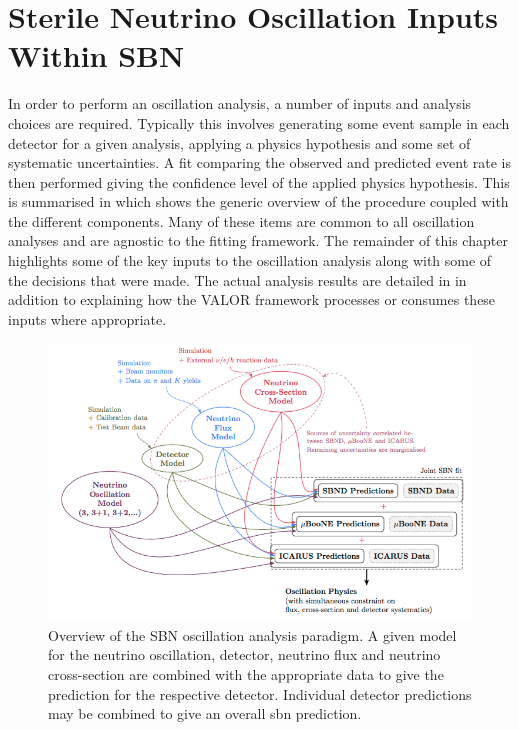 \chapter{Sterile Neutrino Oscillation Inputs Within SBN}
\label{chap:osc_inputs}

In order to perform an oscillation analysis, a number of inputs and analysis choices are required. Typically this involves generating some event sample in each detector for a given analysis, applying a physics hypothesis and some set of systematic uncertainties. A fit comparing the observed and predicted event rate is then performed giving the confidence level of the applied physics hypothesis. This is summarised in  which shows the generic overview of the procedure coupled with the different components. Many of these items are common to all oscillation analyses and are agnostic to the fitting framework. The remainder of this chapter highlights some of the key inputs to the oscillation analysis along with some of the decisions that were made. The actual analysis results are detailed in  in addition to explaining how the VALOR framework processes or consumes these inputs where appropriate.

\begin{figure}[!h]
    \centering
    \includegraphics[width = \textwidth]{figures-chap5/valor_analysis.png}
    \caption[SBN Oscillation analysis paradigm.]{Overview of the SBN oscillation analysis paradigm. A given model for the neutrino oscillation, detector, neutrino flux and neutrino cross-section are combined with the appropriate data to give the prediction for the respective detector. Individual detector predictions may be combined to give an overall \gls{sbn} prediction. }
    \label{fig:analysis_paradigm}
\end{figure}

